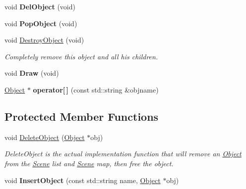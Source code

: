 \begin{DoxyCompactItemize}
\item 
\hypertarget{class_scene_a43fd3c56db5dc940d1724b9573c9a360}{void {\bfseries Del\-Object} (void)}\label{class_scene_a43fd3c56db5dc940d1724b9573c9a360}

\item 
\hypertarget{class_scene_abdfd15e7987aa261840d5ecc265170df}{void {\bfseries Pop\-Object} (void)}\label{class_scene_abdfd15e7987aa261840d5ecc265170df}

\item 
\hypertarget{class_scene_a82759ded1f6f87a91b8d10ed87501958}{void \hyperlink{class_scene_a82759ded1f6f87a91b8d10ed87501958}{Destroy\-Object} (void)}\label{class_scene_a82759ded1f6f87a91b8d10ed87501958}

\begin{DoxyCompactList}\small\item\em Completely remove this object and all his children. \end{DoxyCompactList}\item 
\hypertarget{class_scene_ad5a91c929b569b9111061eec16b3febf}{void {\bfseries Draw} (void)}\label{class_scene_ad5a91c929b569b9111061eec16b3febf}

\item 
\hypertarget{class_scene_ae9b69d8db8a46991017635f22e45baad}{\hyperlink{class_object}{Object} $\ast$ {\bfseries operator\mbox{[}$\,$\mbox{]}} (const std\-::string \&objname)}\label{class_scene_ae9b69d8db8a46991017635f22e45baad}

\end{DoxyCompactItemize}
\subsection*{Protected Member Functions}
\begin{DoxyCompactItemize}
\item 
void \hyperlink{class_scene_a8bbe0e5b1bfc71034b18e240e86aa285}{Delete\-Object} (\hyperlink{class_object}{Object} $\ast$obj)
\begin{DoxyCompactList}\small\item\em Delete\-Object is the actual implementation function that will remove an \hyperlink{class_object}{Object} from the \hyperlink{class_scene}{Scene} list and \hyperlink{class_scene}{Scene} map, then free the object. \end{DoxyCompactList}\item 
\hypertarget{class_scene_ae8d51ddc196248a7cbd1f3640851dbd4}{void {\bfseries Insert\-Object} (const std\-::string name, \hyperlink{class_object}{Object} $\ast$obj)}\label{class_scene_ae8d51ddc196248a7cbd1f3640851dbd4}

\end{DoxyCompactItemize}
